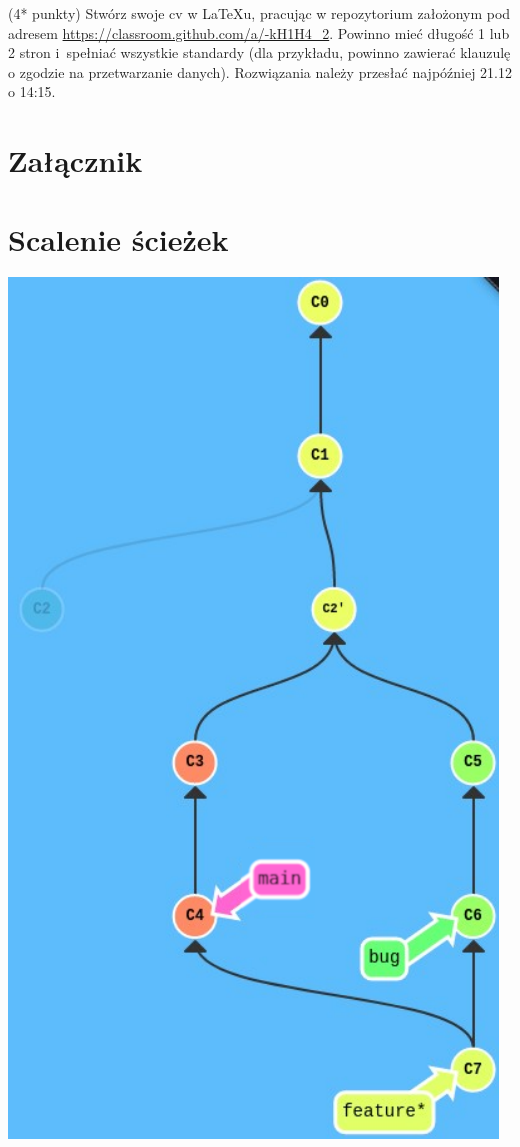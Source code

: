 \begin{zadanie}{(4* punkty)}
Stwórz swoje cv w \LaTeX{}u, pracując w repozytorium założonym pod adresem \url{https://classroom.github.com/a/-kH1H4_2}. Powinno mieć długość 1 lub 2 stron i~spełniać wszystkie standardy (dla przykładu, powinno zawierać klauzulę o zgodzie na przetwarzanie danych). Rozwiązania należy przesłać najpóźniej 21.12 o 14:15.
\end{zadanie}


\newpage
\section*{Załącznik}
\section{Scalenie ścieżek}
\includegraphics[scale=0.45]{830.png}

